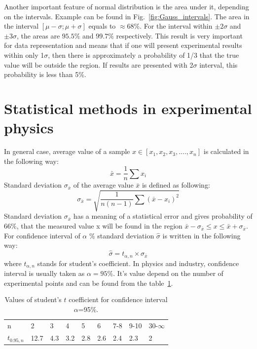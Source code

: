 \documentclass[12pt,a4paper]{report}
\begin{document}
Another important feature of normal distribution is the area under it, depending on the intervals. Example can be found in Fig.~\ref{fig:Gauss_intervals}. The area in the interval $[\mu-\sigma;\mu+\sigma]$ equals to $\approx 68\%$. For the interval within $\pm 2\sigma$ and $\pm 3\sigma$, the areas are $95.5\%$ and $99.7\%$ respectively. This result is very important for data representation and means that if one will present experimental results within only 1$\sigma$, then there is approximately a probability of 1/3 that the true value will be outside the region. If results are presented with 2$\sigma$ interval, this probability is less than 5\%.



\section{Statistical methods in experimental physics} \label{methods}

In general case, average value of a sample $x \in [x_1, x_2, x_3, .... , x_n]$ is calculated in the following way:
\begin{equation} \label{av_value}
\bar{x} = \frac{1}{n} \sum{x_i}
\end{equation}
Standard deviation $\sigma_{\bar{x}}$ of the average value $\bar{x}$ is defined as following:
\begin{equation} \label{standart_dev}
\sigma_{\bar{x}} = \sqrt{\frac{1}{n(n-1)} \sum{(\bar{x}-x_i)^2}} 
\end{equation}
Standard deviation $\sigma_{\bar{x}}$ has a meaning of a statistical error and gives probability of 66$\%$, that the measured value x will be found in the region $\bar{x} - \sigma_{\bar{x}} \le x \le \bar{x} + \sigma_{\bar{x}}$. For confidence interval of $\alpha$ $\%$ standard deviation $\hat{\sigma}$ is written in the following way:
\begin{equation} \label{standart_dev_big}
\hat{\sigma} = t_{\alpha,n}\times \sigma_{\bar{x}}
\end{equation}
where $t_{\alpha,n}$ stands for student's coefficient. In physics and industry, confidence interval is usually taken as $\alpha = 95 \%$. It's value depend on the number of experimental points and can be found from the table~\ref{table:student_t_value}.
\begin{table}[!h]
\begin{center}
\caption{\label{table:student_t_value} Values of student's $t$ coefficient for confidence interval $\alpha$=95$\%$.}
\begin{tabular}{l l l l l l l l l}
\hline
n & 2 & 3 & 4 & 5 & 6 & 7-8 & 9-10 & 30-$\infty$  \\
$t_{0.95, n}$ &12.7 & 4.3 & 3.2 & 2.8 & 2.6 & 2.4 & 2.3 & 2 \\
\hline
\end{tabular}
\end{center}
\end{table}
\end{document}
